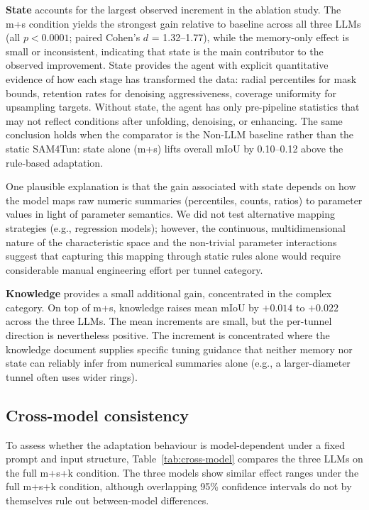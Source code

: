 \documentclass[a4paper,fleqn]{cas-dc}
\begin{document}
\textbf{State} accounts for the largest observed increment in the ablation study. The m+s condition yields the strongest gain relative to baseline across all three LLMs (all $p < 0.0001$; paired Cohen's \mbox{$d$} = 1.32--1.77), while the memory-only effect is small or inconsistent, indicating that state is the main contributor to the observed improvement. State provides the agent with explicit quantitative evidence of how each stage has transformed the data: radial percentiles for mask bounds, retention rates for denoising aggressiveness, coverage uniformity for upsampling targets. Without state, the agent has only pre-pipeline statistics that may not reflect conditions after unfolding, denoising, or enhancing. The same conclusion holds when the comparator is the Non-LLM baseline rather than the static SAM4Tun: state alone (m+s) lifts overall mIoU by 0.10--0.12 above the rule-based adaptation.


One plausible explanation is that the gain associated with state depends on how the model maps raw numeric summaries (percentiles, counts, ratios) to parameter values in light of parameter semantics. We did not test alternative mapping strategies (e.g., regression models); however, the continuous, multidimensional nature of the characteristic space and the non-trivial parameter interactions suggest that capturing this mapping through static rules alone would require considerable manual engineering effort per tunnel category.

\textbf{Knowledge} provides a small additional gain, concentrated in the complex category. On top of m+s, knowledge raises mean mIoU by $+0.014$ to $+0.022$ across the three LLMs. The mean increments are small, but the per-tunnel direction is nevertheless positive. The increment is concentrated where the knowledge document supplies specific tuning guidance that neither memory nor state can reliably infer from numerical summaries alone (e.g.,  a larger-diameter tunnel often uses wider rings).


\subsection{Cross-model consistency}\label{sec:consistency}

To assess whether the adaptation behaviour is model-dependent under a fixed prompt and input structure, Table~\ref{tab:cross-model} compares the three LLMs on the full m+s+k condition. The three models show similar effect ranges under the full m+s+k condition, although overlapping 95\% confidence intervals do not by themselves rule out between-model differences.
\end{document}
